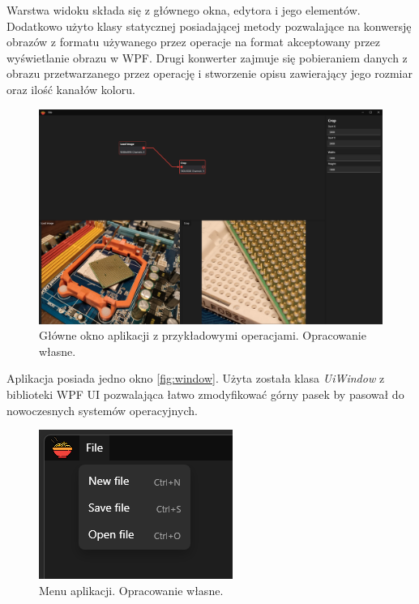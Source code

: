 Warstwa widoku składa się z głównego okna, edytora i jego elementów.
Dodatkowo użyto klasy statycznej posiadającej metody pozwalające na konwersję obrazów z formatu używanego przez operacje na format akceptowany przez wyświetlanie obrazu w WPF.
Drugi konwerter zajmuje się pobieraniem danych z obrazu przetwarzanego przez operację i stworzenie opisu zawierający jego rozmiar oraz ilość kanałów koloru.

\begin{figure}[H]
    \centering
    \includegraphics[width=1\linewidth]{images/Picture13.png}
    \caption{Główne okno aplikacji z przykładowymi operacjami. Opracowanie własne.}
    \label{fig:window}
\end{figure}

Aplikacja posiada jedno okno \autoref{fig:window}. 
Użyta została klasa \textit{UiWindow} z biblioteki WPF UI \cite{wpfui} pozwalająca łatwo zmodyfikować górny pasek by pasował do nowoczesnych systemów operacyjnych. 

\begin{figure}[H]
    \centering
    \includegraphics[width=0.6\linewidth]{images/Picture14.png}
    \caption{Menu aplikacji. Opracowanie własne.}
    \label{fig:mainmenu}
\end{figure}

